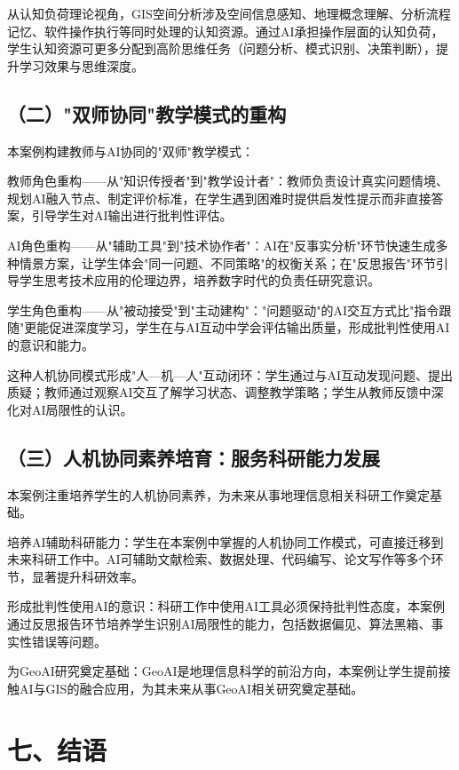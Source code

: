 \documentclass[12pt, a4paper]{article}
\begin{document}
从认知负荷理论视角，GIS空间分析涉及空间信息感知、地理概念理解、分析流程记忆、软件操作执行等同时处理的认知资源。通过AI承担操作层面的认知负荷，学生认知资源可更多分配到高阶思维任务（问题分析、模式识别、决策判断），提升学习效果与思维深度。

\subsection{（二）"双师协同"教学模式的重构}

本案例构建教师与AI协同的"双师"教学模式：

教师角色重构——从"知识传授者"到"教学设计者"：教师负责设计真实问题情境、规划AI融入节点、制定评价标准，在学生遇到困难时提供启发性提示而非直接答案，引导学生对AI输出进行批判性评估。

AI角色重构——从"辅助工具"到"技术协作者"：AI在"反事实分析"环节快速生成多种情景方案，让学生体会"同一问题、不同策略"的权衡关系；在"反思报告"环节引导学生思考技术应用的伦理边界，培养数字时代的负责任研究意识。

学生角色重构——从"被动接受"到"主动建构"："问题驱动"的AI交互方式比"指令跟随"更能促进深度学习，学生在与AI互动中学会评估输出质量，形成批判性使用AI的意识和能力。

这种人机协同模式形成"人—机—人"互动闭环：学生通过与AI互动发现问题、提出质疑；教师通过观察AI交互了解学习状态、调整教学策略；学生从教师反馈中深化对AI局限性的认识。

\subsection{（三）人机协同素养培育：服务科研能力发展}

本案例注重培养学生的人机协同素养，为未来从事地理信息相关科研工作奠定基础。

培养AI辅助科研能力：学生在本案例中掌握的人机协同工作模式，可直接迁移到未来科研工作中。AI可辅助文献检索、数据处理、代码编写、论文写作等多个环节，显著提升科研效率。

形成批判性使用AI的意识：科研工作中使用AI工具必须保持批判性态度，本案例通过反思报告环节培养学生识别AI局限性的能力，包括数据偏见、算法黑箱、事实性错误等问题。

为GeoAI研究奠定基础：GeoAI是地理信息科学的前沿方向\citep{gai2023}，本案例让学生提前接触AI与GIS的融合应用，为其未来从事GeoAI相关研究奠定基础。

\newpage

\section{七、结语}
\end{document}
